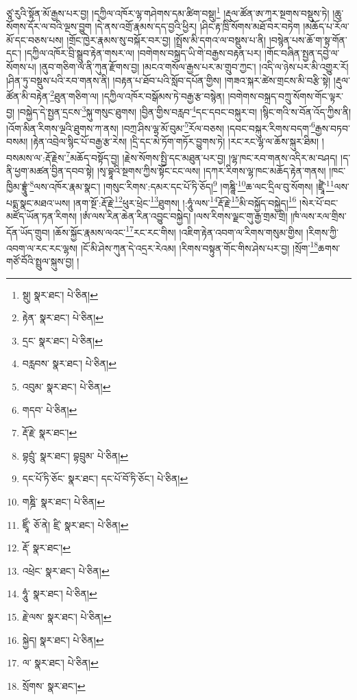 ཙཱ་རུའི་སྟོན་མོ་རྒྱས་པར་བྱ། །དཀྱིལ་འཁོར་ལྷ་གཤེགས་དམ་ཚིག་བསྡུ།\footnote{སྡུ།  སྣར་ཐང་།  པེ་ཅིན། } །རྡུལ་ཚོན་ཨ་ཀཱར་སྔགས་བསྡུས་ཏེ། །ཆུ་སོགས་དོར་ལ་བའི་ལྔས་བྱུག །དེ་ནས་འགྲོ་རྣམས་དད་བྱའི་ཕྱིར། །ཤིང་རྟ་ཁྲི་སོགས་མཐོ་བར་བཏེག །མཆོད་པ་རོལ་མོ་དང་བཅས་པས། །གྲོང་ཁྱེར་རྣམས་སུ་བསྐོར་བར་བྱ། །སྤྲོས་མི་དགའ་ལ་བསྡུས་པ་ནི། །བསྙེན་པས་ཆོ་ག་སྟ་གོན་དང་། །དཀྱིལ་འཁོར་བྲི་སྒྲུབ་རྟེན་གསར་ལ། །བགེགས་བསྐྲད་ཡི་གེ་བརྒྱས་བརྟན་པར། །གོང་བཞིན་སྤྱན་དབྱེ་ལ་སོགས་པ། །ནུབ་གཅིག་ལ་ནི་ཀུན་རྫོགས་བྱ། །མངའ་གསོལ་རྒྱས་པར་མ་གྲུབ་ཀྱང་། །འདི་ལ་ཉེས་པར་མི་འགྱུར་རོ། །ཤིན་ཏུ་བསྡུས་པའི་རབ་གནས་ནི། །བརྟན་པ་ཐོབ་པའི་སློབ་དཔོན་གྱིས། །གཟའ་སྐར་ཚེས་གྲངས་མི་བརྩི་སྟེ། །རྡུལ་ཚོན་མི་བརྟེན་\footnote{རྟེན་  སྣར་ཐང་།  པེ་ཅིན། }ཐུན་གཅིག་ལ། །དཀྱིལ་འཁོར་བསྒོམས་ཏེ་བརྒྱ་རྩ་བསྙེན། །བགེགས་བསྐྲད་བཀྲུ་སོགས་གོང་ལྟར་བྱ། །བསྐྱེད་དེ་སྤྱན་དྲངས་\footnote{དྲང་  སྣར་ཐང་།  པེ་ཅིན། }སྐུ་གསུང་ཐུགས། །བྱིན་གྱིས་བརླབ་\footnote{བརླབས་  སྣར་ཐང་།  པེ་ཅིན། }དང་དབང་བསྐུར་བ། །སྙིང་གའི་ས་བོན་འོད་ཀྱིས་ནི། །འོག་མིན་རིགས་ལྔའི་ཐུགས་ཀ་ནས། །བཀྲ་ཤིས་ལྷ་མོ་བུམ་\footnote{འབུམ་  སྣར་ཐང་།  པེ་ཅིན། }རོལ་བཅས། །དབང་བསྐུར་རིགས་བདག་\footnote{གདབ་  པེ་ཅིན། }རྒྱས་བཏབ་བསམ། །རྟེན་འབྲེལ་སྙིང་པོ་བརྒྱ་རྩ་རེས། །དྲི་དང་མེ་ཏོག་གཏོར་བྱུགས་ཏེ། །རང་རང་ལྷ་ལ་ཆོས་སྐུར་ཐིམ། །བསམས་ལ་:རྡོ་རྗེས་\footnote{རྡོ་རྗེ་  སྣར་ཐང་། }མཆོད་བསྟོད་བྱ། །རྗེས་སོགས་སྤྱི་དང་མཐུན་པར་བྱ། །ལྷ་ཁང་རབ་གནས་འདིར་མ་བཤད། །ད་ནི་ཕྱག་མཚན་བྱིན་དབབ་སྟེ། །སྭ་བྷཱའི་སྔགས་ཀྱིས་སྟོང་ངང་ལས། །དཀར་རིགས་ལྷ་ཁང་མཆོད་རྟེན་གནས། །ཁང་ཁྱིམ་བྷྲཱུཾ་\footnote{བྷབྲུཾ་  སྣར་ཐང་། བྷབྲུམ་  པེ་ཅིན། }ལས་འཁོར་རྣམ་སྣང་། །གསུང་རིགས་:དམར་དང་པོ་ཏི་ཅོད།\footnote{དང་པོ་ཏི་ཅོང་  སྣར་ཐང་། དང་པོ་བོ་ཏི་ཅོང་།  པེ་ཅིན། } །གཎྜཱི་\footnote{གཎྜི་  སྣར་ཐང་།  པེ་ཅིན། }ཆ་ལང་དྲིལ་བུ་སོགས། །ཛྲཱྀཾ་\footnote{ཛྲཱིཾ་  ཅོ་ནེ། ཛྲི་  སྣར་ཐང་།  པེ་ཅིན། }ལས་པདྨ་སྣང་མཐའ་ཡས། །ནག་སྔོ་:རྡོ་རྗེ་\footnote{རྡོ་  སྣར་ཐང་། }ཕུར་ཕྲེང་\footnote{འཕྲེང་  སྣར་ཐང་།  པེ་ཅིན། }ཐུགས། །:ཧཱུཾ་ལས་\footnote{ཧཱུཾ་  སྣར་ཐང་།  པེ་ཅིན། }རྡོ་རྗེ་\footnote{རྗེ་ལས་  སྣར་ཐང་།  པེ་ཅིན། }མི་བསྐྱོད་བསྐྱེད།\footnote{སྐྱེད།  སྣར་ཐང་།  པེ་ཅིན། } །སེར་པོ་བང་མཛོད་ཡོན་ཏན་རིགས། །ཨཾ་ལས་རིན་ཆེན་རིན་འབྱུང་བསྐྱེད། །ལས་རིགས་ལྗང་གུ་རྒྱ་གྲམ་གྲི། །ཁཾ་ལས་རལ་གྲིས་དོན་ཡོད་གྲུབ། །ཆོས་སྐྱོང་རྣམས་ལའང་\footnote{ལ་  སྣར་ཐང་།  པེ་ཅིན། }རང་རང་གིས། །འཇིག་རྟེན་འབག་ལ་རིགས་གསུམ་གྱིས། །རིགས་ཀྱི་འབག་ལ་རང་རང་ལྷས། །ངོ་མི་ཤེས་ཀུན་དེ་འདྲར་རེའམ། །རིགས་བསྟུན་གོང་གིས་ཤེས་པར་བྱ། །སྲོག་\footnote{སྲོགས་  སྣར་ཐང་། }ཆགས་གཙོ་བོའི་སྤྲུལ་སྐུས་བྱ། །
